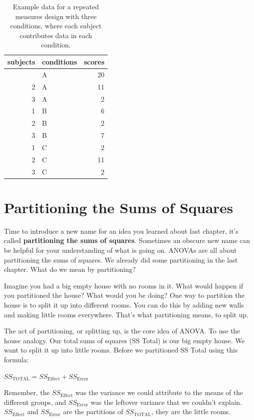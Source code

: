 \documentclass[
  letterpaper,
  DIV=11,
  numbers=noendperiod]{scrreprt}
\begin{document}
\begin{longtable}[]{@{}rlr@{}}

\caption{\label{tbl-8rmdata2}Example data for a repeated measures design
with three conditions, where each subject contributes data in each
condition.}

\tabularnewline

\toprule\noalign{}
subjects & conditions & scores \\
\midrule\noalign{}
\endhead
\bottomrule\noalign{}
\endlastfoot
1 & A & 20 \\
2 & A & 11 \\
3 & A & 2 \\
1 & B & 6 \\
2 & B & 2 \\
3 & B & 7 \\
1 & C & 2 \\
2 & C & 11 \\
3 & C & 2 \\

\end{longtable}

\section{Partitioning the Sums of
Squares}\label{partitioning-the-sums-of-squares}

Time to introduce a new name for an idea you learned about last chapter,
it's called \textbf{partitioning the sums of squares}. Sometimes an
obscure new name can be helpful for your understanding of what is going
on. ANOVAs are all about partitioning the sums of squares. We already
did some partitioning in the last chapter. What do we mean by
partitioning?

Imagine you had a big empty house with no rooms in it. What would happen
if you partitioned the house? What would you be doing? One way to
partition the house is to split it up into different rooms. You can do
this by adding new walls and making little rooms everywhere. That's what
partitioning means, to split up.

The act of partitioning, or splitting up, is the core idea of ANOVA. To
use the house analogy. Our total sums of squares (SS Total) is our big
empty house. We want to split it up into little rooms. Before we
partitioned SS Total using this formula:

\(SS_\text{TOTAL} = SS_\text{Effect} + SS_\text{Error}\)

Remember, the \(SS_\text{Effect}\) was the variance we could attribute
to the means of the different groups, and \(SS_\text{Error}\) was the
leftover variance that we couldn't explain. \(SS_\text{Effect}\) and
\(SS_\text{Error}\) are the partitions of \(SS_\text{TOTAL}\), they are
the little rooms.
\end{document}
